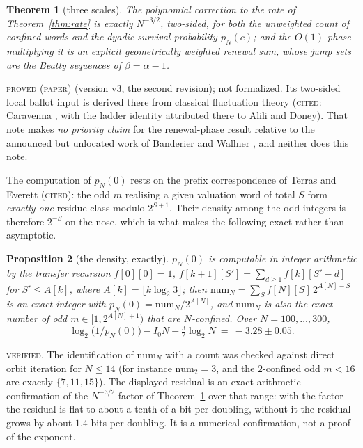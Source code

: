 \documentclass[11pt,reqno]{amsart}
\theoremstyle{plain}
\newtheorem{theorem}{Theorem}[section]
\newtheorem{proposition}[theorem]{Proposition}
\theoremstyle{definition}
\newcommand{\lab}[1]{\textnormal{\textsc{\small #1}}}
\begin{document}
\begin{theorem}[three scales]\label{thm:scales}
The polynomial correction to the rate of Theorem~\ref{thm:rate} is exactly
$N^{-3/2}$, two-sided, for both the unweighted count of confined words and the
dyadic survival probability $p_N(c)$; and the $O(1)$ phase multiplying it is an
explicit geometrically weighted renewal sum, whose jump sets are the Beatty
sequences of $\beta=\alpha-1$.
\end{theorem}
\lab{proved (paper)} \cite{DeJesusScales} (version v3, the second revision); not
formalized. Its two-sided local ballot input is derived there from classical
fluctuation theory (\lab{cited}: Caravenna \cite{Caravenna2005}, with the ladder
identity attributed there to Alili and Doney). That note makes \emph{no priority
claim} for the renewal-phase result relative to the announced but unlocated work
of Banderier and Wallner \cite{BanderierWallner}, and neither does this note.

The computation of $p_N(0)$ rests on the prefix correspondence of Terras
\cite{Terras1976} and Everett \cite{Everett1977} (\lab{cited}): the odd $m$
realising a given valuation word of total $S$ form \emph{exactly one} residue
class modulo $2^{S+1}$. Their density among the odd integers is therefore $2^{-S}$
on the nose, which is what makes the following exact rather than asymptotic.

\begin{proposition}[the density, exactly]\label{prop:density}
$p_N(0)$ is computable in integer arithmetic by the transfer recursion
$f[0][0]=1$, $f[k+1][S']=\sum_{d\ge1}f[k][S'-d]$ for $S'\le A[k]$, where
$A[k]=\lfloor k\log_2 3\rfloor$; then
$\mathrm{num}_N=\sum_S f[N][S]\,2^{A[N]-S}$ is an exact integer with
$p_N(0)=\mathrm{num}_N/2^{A[N]}$, and $\mathrm{num}_N$ is \emph{also} the exact
number of odd $m\in[1,2^{A[N]+1})$ that are $N$-confined. Over $N=100,\dots,300$,
\[
\log_2\bigl(1/p_N(0)\bigr)-I_0N-\tfrac32\log_2 N\ =\ -3.28\pm0.05 .
\]
\end{proposition}
\lab{verified}. The identification of $\mathrm{num}_N$ with a count was checked
against direct orbit iteration for $N\le14$ (for instance $\mathrm{num}_2=3$, and
the $2$-confined odd $m<16$ are exactly $\{7,11,15\}$). The displayed residual is
an exact-arithmetic confirmation of the $N^{-3/2}$ factor of
Theorem~\ref{thm:scales} over that range: with the factor the residual is flat to
about a tenth of a bit per doubling, without it the residual grows by about $1.4$
bits per doubling. It is a numerical confirmation, not a proof of the exponent.
\end{document}
